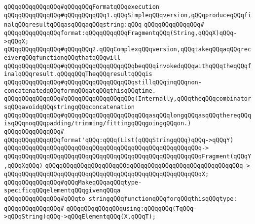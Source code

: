 \newline
\newline
\verb|qQQqqQQqqQQqqQQq#qQQqqQQqFormatqQQqexecution|\newline
\newline
\verb|qQQqqQQqqQQqqQQq#qQQqqQQqqQQq1.qQQqSimpleqQQqversion,qQQqproduceqQQqfinalqQQqresultqQQqasqQQqaqQQqstring:qQQq|\newline
\verb|qQQqqQQqqQQqqQQq#|\newline
\verb|qQQqqQQqqQQqqQQqformat:qQQqqQQqqQQqFragmentqQQq(String,qQQqX)qQQq->qQQqX;|\newline
\newline
\verb|qQQqqQQqqQQqqQQq#qQQqqQQq2.qQQqComplexqQQqversion,qQQqtakeqQQqaqQQqreceiverqQQqfunctionqQQqthatqQQqwill|\newline
\verb|qQQqqQQqqQQqqQQq#qQQqqQQqqQQqqQQqqQQqbeqQQqinvokedqQQqwithqQQqtheqQQqfinalqQQqresult.qQQqqQQqTheqQQqresultqQQqis|\newline
\verb|qQQqqQQqqQQqqQQq#qQQqqQQqqQQqqQQqqQQqstillqQQqinqQQqnon-concatenatedqQQqformqQQqatqQQqthisqQQqtime.|\newline
\verb|qQQqqQQqqQQqqQQq#qQQqqQQqqQQqqQQqqQQq(Internally,qQQqtheqQQqcombinatorsqQQqavoidqQQqstringqQQqconcatenation|\newline
\verb|qQQqqQQqqQQqqQQq#qQQqqQQqqQQqqQQqqQQqqQQqasqQQqlongqQQqasqQQqthereqQQqisqQQqnoqQQqpadding/trimming/fittingqQQqgoingqQQqon.)|\newline
\verb|qQQqqQQqqQQqqQQq#|\newline
\verb|qQQqqQQqqQQqqQQqformat'qQQq:qQQq(List(qQQqStringqQQq)qQQq->qQQqY)|\newline
\verb|qQQqqQQqqQQqqQQqqQQqqQQqqQQqqQQqqQQqqQQqqQQqqQQqqQQqqQQq->|\newline
\verb|qQQqqQQqqQQqqQQqqQQqqQQqqQQqqQQqqQQqqQQqqQQqqQQqqQQqqQQqFragment(qQQqY,qQQqXqQQq)|\newline
\verb|qQQqqQQqqQQqqQQqqQQqqQQqqQQqqQQqqQQqqQQqqQQqqQQqqQQqqQQq->|\newline
\verb|qQQqqQQqqQQqqQQqqQQqqQQqqQQqqQQqqQQqqQQqqQQqqQQqqQQqqQQqX;|\newline
\newline
\newline
\verb|qQQqqQQqqQQqqQQq#qQQqMakeqQQqaqQQqtype-specificqQQqelementqQQqgivenqQQqa|\newline
\verb|qQQqqQQqqQQqqQQq#qQQqto_stringqQQqfunctionqQQqforqQQqthisqQQqtype:|\newline
\verb|qQQqqQQqqQQqqQQq#|\newline
\verb|qQQqqQQqqQQqqQQqusing:qQQqqQQq(TqQQq->qQQqString)qQQq->qQQqElementqQQq(X,qQQqT);|\newline
